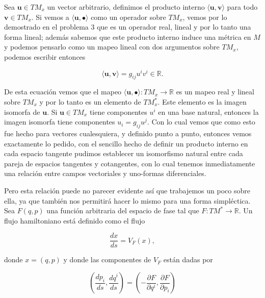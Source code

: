 \documentclass[a4paper,10pt]{article}
\numberwithin{equation}{section}
\begin{document}
\vspace{.3cm}

Sea $\mathbf{u} \in TM_x$ un vector arbitrario, definimos el producto interno 
$\langle \mathbf{u} , \mathbf{v} \rangle$ para todo $\mathbf{v} \in TM_x$. Si vemos 
a $\langle \mathbf{u} , \bullet \rangle$ como un operador sobre $TM_x$, vemos 
por lo demostrado en el problema 3 que es un operador real, lineal y por 
lo tanto una forma lineal; además sabemos que este producto interno induce 
una métrica en $M$ y podemos pensarlo como un mapeo lineal con dos argumentos 
sobre $TM_x$, podemos escribir entonces 

\begin{equation}
 \langle \mathbf{u} , \mathbf{v} \rangle = g_{ij}u^iv^i \in \mathbb{R}.
\end{equation}

De esta ecuación vemos que el mapeo $\langle \mathbf{u} , \bullet \rangle: TM_x 
\rightarrow \mathbb{R}$ es un mapeo real y lineal sobre $TM_x$ y por lo tanto 
es un elemento de $TM_x^*$. Este elemento es la imagen isomorfa de $\mathbf{u}$. 
Si $\mathbf{u} \in TM_x$ tiene componentes $u^i$ en una base natural, entonces 
la imagen isomorfa tiene componentes $u_i = g_{ij}u^j$. Con lo cual vemos que 
como esto fue hecho para vectores cualesquiera, y definido punto a punto, entonces 
vemos exactamente lo pedido, con el sencillo hecho de definir un producto interno 
en cada espacio tangente pudimos establecer un isomorfismo natural entre 
cada pareja de espacios tangentes y cotangentes, con lo cual tenemos inmediatamente 
una relación entre campos vectoriales y uno-formas diferenciales.

\vspace{.3cm}

Pero esta relación puede no parecer evidente así que trabajemos un poco sobre ella,
ya que también nos permitirá hacer lo mismo para una forma simpléctica. Sea $F(q,p)$ 
una función arbitraria del espacio de fase tal que $F: TM^* \rightarrow \mathbb{R}$. Un
flujo hamiltoniano está definido como el flujo 

\begin{equation}
 \frac{dx}{ds} = V_F(x),
 \label{eq:83}
\end{equation}

donde $x=(q,p)$ y donde las componentes de $V_F$ están dadas por 

\begin{equation}
 \left(\frac{dp_i}{ds}, \frac{dq^i}{ds}\right) = 
 \left(- \frac{\partial F}{\partial q^i}, \frac{\partial F}{\partial p_i}\right)
 \label{eq:82}
\end{equation}
\end{document}
